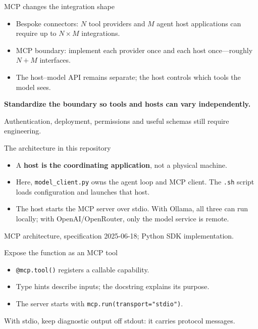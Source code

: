 \documentclass[aspectratio=169,11pt]{beamer}
\newcommand{\src}[1]{\par\vspace{1mm}{\tiny\color{gray}\texttt{\detokenize{#1}}}\par}
\begin{document}
\begin{frame}{MCP changes the integration shape}
\centering\resizebox{.74\textwidth}{!}{}
\par\vspace{2mm}\raggedright\small
\begin{itemize}\setlength\itemsep{0mm}
\item Bespoke connectors: $N$ tool providers and $M$ agent host applications
can require up to $N\!\times\!M$ integrations.
\item MCP boundary: implement each provider once and each host once---roughly
$N+M$ interfaces.
\item The host--model API remains separate; the host controls which tools the
model sees.
\end{itemize}
\par\vspace{1mm}\textbf{Standardize the boundary so tools and hosts can vary independently.}
\par\scriptsize Authentication, deployment, permissions and useful schemas still require engineering.
\end{frame}

\begin{frame}{The architecture in this repository}
\centering\resizebox{.72\textwidth}{!}{}
\par\vspace{2mm}\raggedright\footnotesize
\begin{itemize}\setlength\itemsep{0mm}
\item A \textbf{host is the coordinating application}, not a physical machine.
\item Here, \texttt{model\_client.py} owns the agent loop and MCP client.
The \texttt{.sh} script loads configuration and launches that host.
\item The host starts the MCP server over stdio. With Ollama, all three can run
locally; with OpenAI/OpenRouter, only the model service is remote.
\end{itemize}
\scriptsize MCP architecture, specification 2025-06-18; Python SDK implementation.
\end{frame}

\begin{frame}{Expose the function as an MCP tool}

\src{src/simple_examples/server.py}
\begin{itemize}
\item \texttt{@mcp.tool()} registers a callable capability.
\item Type hints describe inputs; the docstring explains its purpose.
\item The server starts with \texttt{mcp.run(transport="stdio")}.
\end{itemize}
\small With stdio, keep diagnostic output off stdout: it carries protocol messages.
\end{frame}
\end{document}
